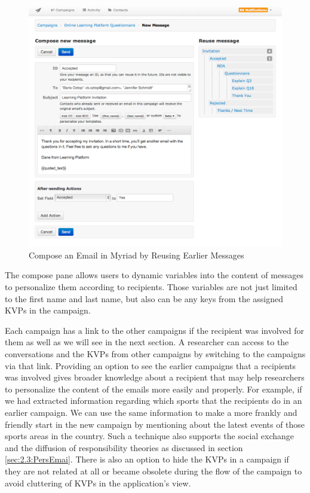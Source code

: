 \begin{figure}[htbp]
	\centering
	\includegraphics[width=1.00\textwidth]{imgs/ComposeEmail.png}
	\caption[Compose an Email in Myriad by Reusing Earlier Messages]{Compose an Email in Myriad by Reusing Earlier Messages}
	\label{fig:ComposeEmail}
\end{figure}

The compose pane allows users to dynamic variables into the content of messages to personalize them according to recipients. Those variables are not just limited to the first name and last name, but also can be any keys from the assigned \ac{KVP}s in the campaign.
\vspace{1cm}

\clearpage

Each campaign has a link to the other campaigns if the recipient was involved for them as well as we will see in the next section. A researcher can access to the conversations and the \ac{KVP}s from other campaigns by switching to the campaigns via that link. Providing an option to see the earlier campaigns that a recipients was involved gives broader knowledge about a recipient that may help researchers to personalize the content of the emails more easily and properly. For example, if we had extracted information regarding which sports that the recipients do in an earlier campaign. We can use the same information to make a more frankly and friendly start in the new campaign by mentioning about the latest events of those sports areas in the country. Such a technique also supports the social exchange and the diffusion of responsibility theories as discussed in section \ref{sec:2.3:PersEmai}. There is also an option to hide the \ac{KVP}s in a campaign if they are not related at all or became obsolete during the flow of the campaign to avoid cluttering of \ac{KVP}s in the application's view.
\vspace{1cm}

